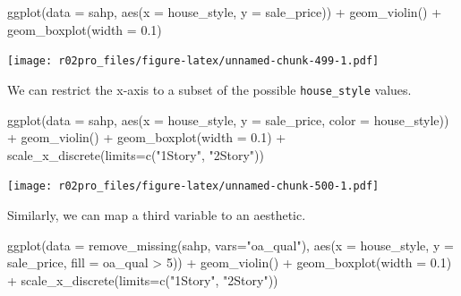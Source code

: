 \documentclass[
]{book}
\newenvironment{Shaded}{\begin{snugshade}}{\end{snugshade}}
\newcommand{\AttributeTok}[1]{\textcolor[rgb]{0.77,0.63,0.00}{#1}}
\newcommand{\DecValTok}[1]{\textcolor[rgb]{0.00,0.00,0.81}{#1}}
\newcommand{\FloatTok}[1]{\textcolor[rgb]{0.00,0.00,0.81}{#1}}
\newcommand{\FunctionTok}[1]{\textcolor[rgb]{0.00,0.00,0.00}{#1}}
\newcommand{\NormalTok}[1]{#1}
\newcommand{\SpecialCharTok}[1]{\textcolor[rgb]{0.00,0.00,0.00}{#1}}
\newcommand{\StringTok}[1]{\textcolor[rgb]{0.31,0.60,0.02}{#1}}
\begin{document}
\begin{Shaded}
\begin{Highlighting}[]
\FunctionTok{ggplot}\NormalTok{(}\AttributeTok{data =}\NormalTok{ sahp, }\FunctionTok{aes}\NormalTok{(}\AttributeTok{x =}\NormalTok{ house\_style, }\AttributeTok{y =}\NormalTok{ sale\_price)) }\SpecialCharTok{+} 
  \FunctionTok{geom\_violin}\NormalTok{() }\SpecialCharTok{+}
  \FunctionTok{geom\_boxplot}\NormalTok{(}\AttributeTok{width =} \FloatTok{0.1}\NormalTok{)}
\end{Highlighting}
\end{Shaded}

\texttt{[image: r02pro\_files/figure-latex/unnamed-chunk-499-1.pdf]}

We can restrict the x-axis to a subset of the possible \texttt{house\_style} values.

\begin{Shaded}
\begin{Highlighting}[]
\FunctionTok{ggplot}\NormalTok{(}\AttributeTok{data =}\NormalTok{ sahp, }\FunctionTok{aes}\NormalTok{(}\AttributeTok{x =}\NormalTok{ house\_style, }\AttributeTok{y =}\NormalTok{ sale\_price, }\AttributeTok{color =}\NormalTok{ house\_style)) }\SpecialCharTok{+} 
  \FunctionTok{geom\_violin}\NormalTok{() }\SpecialCharTok{+}
  \FunctionTok{geom\_boxplot}\NormalTok{(}\AttributeTok{width =} \FloatTok{0.1}\NormalTok{) }\SpecialCharTok{+} 
  \FunctionTok{scale\_x\_discrete}\NormalTok{(}\AttributeTok{limits=}\FunctionTok{c}\NormalTok{(}\StringTok{"1Story"}\NormalTok{, }\StringTok{"2Story"}\NormalTok{))}
\end{Highlighting}
\end{Shaded}

\texttt{[image: r02pro\_files/figure-latex/unnamed-chunk-500-1.pdf]}

Similarly, we can map a third variable to an aesthetic.

\begin{Shaded}
\begin{Highlighting}[]
\FunctionTok{ggplot}\NormalTok{(}\AttributeTok{data =} \FunctionTok{remove\_missing}\NormalTok{(sahp, }\AttributeTok{vars=}\StringTok{"oa\_qual"}\NormalTok{), }\FunctionTok{aes}\NormalTok{(}\AttributeTok{x =}\NormalTok{ house\_style, }\AttributeTok{y =}\NormalTok{ sale\_price, }\AttributeTok{fill =}\NormalTok{ oa\_qual }\SpecialCharTok{\textgreater{}} \DecValTok{5}\NormalTok{)) }\SpecialCharTok{+} 
  \FunctionTok{geom\_violin}\NormalTok{() }\SpecialCharTok{+}
  \FunctionTok{geom\_boxplot}\NormalTok{(}\AttributeTok{width =} \FloatTok{0.1}\NormalTok{) }\SpecialCharTok{+} 
  \FunctionTok{scale\_x\_discrete}\NormalTok{(}\AttributeTok{limits=}\FunctionTok{c}\NormalTok{(}\StringTok{"1Story"}\NormalTok{, }\StringTok{"2Story"}\NormalTok{))}
\end{Highlighting}
\end{Shaded}
\end{document}
